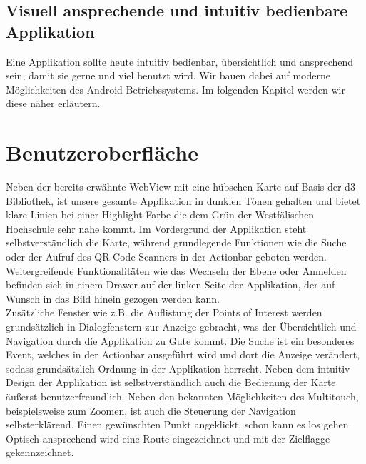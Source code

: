 \subsection{Visuell ansprechende und intuitiv bedienbare Applikation}
Eine Applikation sollte heute intuitiv bedienbar, übersichtlich und ansprechend sein, damit sie gerne und viel benutzt wird. Wir bauen dabei auf moderne Möglichkeiten des
Android Betriebssystems. Im folgenden Kapitel werden wir diese näher erläutern.

\section{Benutzeroberfläche}
Neben der bereits erwähnte WebView mit eine hübschen Karte auf Basis der d3 Bibliothek, ist unsere gesamte Applikation in dunklen Tönen gehalten und bietet klare Linien bei
einer Highlight-Farbe die dem Grün der Westfälischen Hochschule sehr nahe kommt. 
Im Vordergrund der Applikation steht selbstverständlich die Karte, während grundlegende Funktionen wie die Suche oder der Aufruf des QR-Code-Scanners in der Actionbar geboten werden.
Weitergreifende Funktionalitäten wie das Wechseln der Ebene oder Anmelden befinden sich in einem Drawer auf der linken Seite der Applikation, der auf Wunsch in das Bild hinein gezogen
werden kann. \\
Zusätzliche Fenster wie z.B. die Auflistung der Points of Interest werden grundsätzlich in Dialogfenstern zur Anzeige gebracht, was der Übersichtlich und Navigation durch die Applikation zu Gute kommt. Die Suche ist ein besonderes Event, welches in der Actionbar ausgeführt wird und dort die Anzeige verändert, sodass grundsätzlich Ordnung in der Applikation herrscht.
Neben dem intuitiv Design der Applikation ist selbstverständlich auch die Bedienung der Karte äußerst benutzerfreundlich. Neben den bekannten Möglichkeiten des Multitouch, beispielsweise zum Zoomen, ist auch die Steuerung der Navigation selbsterklärend. Einen gewünschten Punkt angeklickt, schon kann es los gehen. Optisch ansprechend wird eine Route eingezeichnet und mit der Zielflagge gekennzeichnet.


